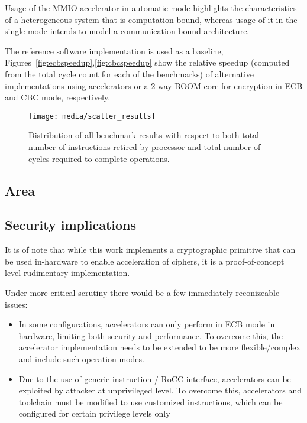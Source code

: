 \documentclass[10pt,conference]{IEEEtran}
\begin{document}
Usage of the MMIO accelerator in automatic mode highlights the characteristics
of a heterogeneous system that is computation-bound, whereas usage of it in the
single mode intends to model a communication-bound architecture.

The reference software implementation is used as a baseline,
Figures~\ref{fig:ecbspeedup},\ref{fig:cbcspeedup} show the relative speedup
(computed from the total cycle count for each of the benchmarks) of alternative
implementations using accelerators or a 2-way BOOM core for encryption in ECB
and CBC mode, respectively.



\begin{figure}
  \centering
  \texttt{[image: media/scatter\_results]}
  \caption{Distribution of all benchmark results with respect to both total
    number of instructions retired by processor and total number of cycles
    required to complete operations.}
  \label{fig:scatter}
\end{figure}

\subsection{Area}

\subsection{Security implications}

It is of note that while this work implements a cryptographic primitive that can
be used in-hardware to enable acceleration of ciphers, it is a proof-of-concept
level rudimentary implementation.

Under more critical scrutiny there would be a few immediately reconizeable
issues:

\begin{itemize}
  \item In some configurations, accelerators can only perform in ECB mode in
    hardware, limiting both security and performance. To overcome this, the
    accelerator implementation needs to be extended to be more flexible/complex
    and include such operation modes.
  \item Due to the use of generic instruction / RoCC interface, accelerators
    can be exploited by attacker at unprivileged level. To overcome this,
    accelerators and toolchain must be modified to use customized instructions,
    which can be configured for certain privilege levels only
\end{itemize}
\end{document}
